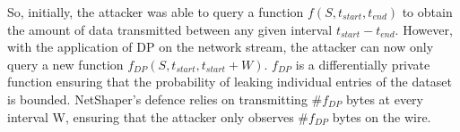 So, initially, the attacker was able to query a function $f(S, t_{start}, t_{end})$ to obtain the amount of data transmitted between any given interval $t_{start} - t_{end}$. 
However, with the application of DP on the network stream, the attacker can now only query a new function $f_{DP}(S, t_{start}, t_{start} + W)$.
$f_{DP}$ is a differentially private function ensuring that the probability of leaking individual entries of the dataset is bounded.
NetShaper's defence relies on transmitting \#$f_{DP}$ bytes at every interval W, ensuring that the attacker only observes \#$f_{DP}$ bytes on the wire.

\endinput

Note: Should we add stuff about sensitivity? (I don't think it's necessary for my thesis)